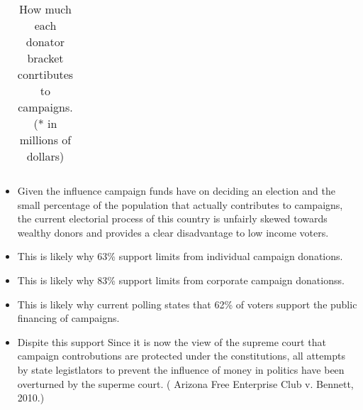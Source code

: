 \documentclass[11pt]{article} %
\begin{document}
\begin{itemize}
\begin{table}
\begin{tabular}{|l|l|l|l|l|l|}
        \hline
    \end{tabular}
 \caption{How much each donator bracket conrtibutes to campaigns. (* in millions of dollars) }
\end{table}



\item Given the influence campaign funds have on deciding an election and the small percentage of the population that actually contributes to campaigns, the current electorial process of this country is unfairly skewed towards wealthy donors and provides a clear disadvantage to low income voters. 

\item This is likely why 63\% support limits from individual campaign donations. ~\cite{Poll2012}

\item This is likely why 83\% support limits from corporate campaign donationss. ~\cite{Poll2012}

\item This is likely why current polling states that 62\% of voters support the public financing of campaigns. ~\cite{Greenberg2010}

\item Dispite this support Since it is now the view of the supreme court that campaign controbutions are protected under the constitutions, all attempts by state legistlators to prevent the influence of money in politics have been overturned by the superme court. ( Arizona Free Enterprise Club v. Bennett, 2010.)


\begin{comment}

Suppose that elections in PA are fair. Then  by the definition of a fair election, Elections in PA are free and equal. This means that by the definition of Free Elections in PA are not under the control or in the power of another; ;(Google definitions).   Also, this means that elections are equal.  However. statistically electorial wins are strongly corrilated with cadates that are better funded, "In 93 percent of House of Representatives races and 94 percent of Senate races that had been decided by mid-day Nov. 5, the candidate who spent the most money ended up winning, according to a post-election analysis by the nonpartisan Center for Responsive Politics. The findings are based on candidates' spending through Oct. 15, as reported to the Federal Election Commission." ~\cite{OpenSecretsWins}.  This strongly suggests ( I would have to prove more here probably), That the outcome of an election is determative on campaign controbutions.  Since there is inequality in campaign controbutions, then their is an inequality in how elections are determined. Since there is an inequality in how elections are determine then elections in PA are unequal.    (Only a tiny fraction of Americans actually give campaign contributions to political candidates, parties or PACs. The ones who give contributions large enough to be itemized (over $\$200$ dolars) is even smaller. The impact of those donations, however, is huge.) ~\cite{OpenSecretsDemographics13}  Since they are unequil then they are unfair. 


\end{comment}
\end{itemize}
\end{document}

